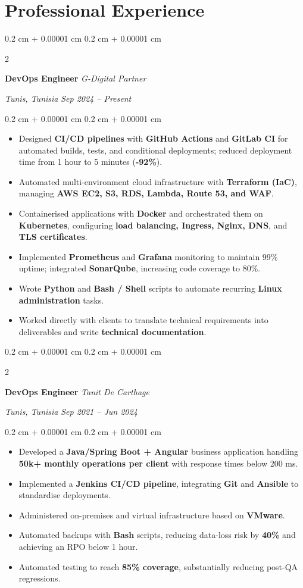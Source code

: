\documentclass[9pt, letterpaper]{article}
\newenvironment{highlights}{
    \begin{itemize}[
        topsep=0.03 cm,
        parsep=0.03 cm,
        partopsep=0pt,
        itemsep=0pt,
        leftmargin=0.4 cm + 10pt
    ]
}{
    \end{itemize}
}
\newenvironment{onecolentry}{
    \begin{adjustwidth}{
        0.2 cm + 0.00001 cm
    }{
        0.2 cm + 0.00001 cm
    }
}{
    \end{adjustwidth}
}
\newenvironment{twocolentry}[2][]{
    \onecolentry
    \def\secondColumn{#2}
    \setcolumnwidth{\fill, 4.5 cm}
    \begin{paracol}{2}
}{
    \switchcolumn \raggedleft \secondColumn
    \end{paracol}
    \endonecolentry
}
\begin{document}
\section{Professional Experience}
\begin{twocolentry}{\textit{Tunis, Tunisia} \textit{Sep 2024 -- Present}}
\textbf{DevOps Engineer}
\textit{G-Digital Partner}
\end{twocolentry}
\begin{onecolentry}
\begin{highlights}
\item Designed \textbf{CI/CD pipelines} with \textbf{GitHub Actions} and \textbf{GitLab CI} for automated builds, tests, and conditional deployments; reduced deployment time from 1 hour to 5 minutes (\textbf{-92\%}).
\item Automated multi-environment cloud infrastructure with \textbf{Terraform (IaC)}, managing \textbf{AWS EC2, S3, RDS, Lambda, Route 53, and WAF}.
\item Containerised applications with \textbf{Docker} and orchestrated them on \textbf{Kubernetes}, configuring \textbf{load balancing, Ingress, Nginx, DNS}, and \textbf{TLS certificates}.
\item Implemented \textbf{Prometheus} and \textbf{Grafana} monitoring to maintain 99\% uptime; integrated \textbf{SonarQube}, increasing code coverage to 80\%.
\item Wrote \textbf{Python} and \textbf{Bash / Shell} scripts to automate recurring \textbf{Linux administration} tasks.
\item Worked directly with clients to translate technical requirements into deliverables and write \textbf{technical documentation}.
\end{highlights}
\end{onecolentry}

\begin{twocolentry}{\textit{Tunis, Tunisia} \textit{Sep 2021 -- Jun 2024}}
\textbf{DevOps Engineer}
\textit{Tanit De Carthage}
\end{twocolentry}
\begin{onecolentry}
\begin{highlights}
\item Developed a \textbf{Java/Spring Boot + Angular} business application handling \textbf{50k+ monthly operations per client} with response times below 200 ms.
\item Implemented a \textbf{Jenkins CI/CD pipeline}, integrating \textbf{Git} and \textbf{Ansible} to standardise deployments.
\item Administered on-premises and virtual infrastructure based on \textbf{VMware}.
\item Automated backups with \textbf{Bash} scripts, reducing data-loss risk by \textbf{40\%} and achieving an RPO below 1 hour.
\item Automated testing to reach \textbf{85\% coverage}, substantially reducing post-QA regressions.
\end{highlights}
\end{onecolentry}
\end{document}
